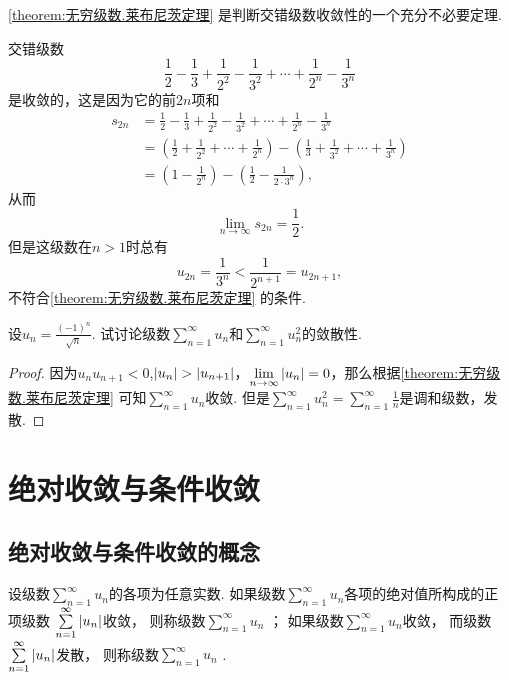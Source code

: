 \cref{theorem:无穷级数.莱布尼茨定理} 是判断交错级数收敛性的一个充分不必要定理.
\begin{example}
交错级数\[
\frac{1}{2} - \frac{1}{3}
+ \frac{1}{2^2} - \frac{1}{3^2}
+ \dotsm + \frac{1}{2^n} - \frac{1}{3^n}
\]是收敛的，这是因为它的前\(2n\)项和\begin{align*}
s_{2n} &= \frac{1}{2} - \frac{1}{3}
+ \frac{1}{2^2} - \frac{1}{3^2}
+ \dotsm + \frac{1}{2^n} - \frac{1}{3^n} \\
&= \left(\frac{1}{2} + \frac{1}{2^2} + \dotsm + \frac{1}{2^n}\right)
 - \left(\frac{1}{3} + \frac{1}{3^2} + \dotsm + \frac{1}{3^n}\right) \\
&= \left(1 - \frac{1}{2^n}\right)
 - \left(\frac{1}{2} - \frac{1}{2\cdot3^n}\right),
\end{align*}从而\[
\lim\limits_{n\to\infty} s_{2n} = \frac{1}{2}.
\]但是这级数在\(n>1\)时总有\[
u_{2n} = \frac{1}{3^n} < \frac{1}{2^{n+1}} = u_{2n+1},
\]不符合\cref{theorem:无穷级数.莱布尼茨定理} 的条件.
\end{example}

\begin{example}
设\(u_n = \frac{(-1)^n}{\sqrt{n}}\).
试讨论级数\(\sum\limits_{n=1}^\infty u_n\)和\(\sum\limits_{n=1}^\infty u_n^2\)的敛散性.
\begin{proof}
因为\(u_n u_{n+1} < 0\),\(\abs{u_n} > \abs{u_{n+1}}\)，\(\lim\limits_{n\to\infty} \abs{u_n} = 0\)，那么根据\cref{theorem:无穷级数.莱布尼茨定理} 可知\(\sum\limits_{n=1}^\infty u_n\)收敛.
但是\(\sum\limits_{n=1}^\infty u_n^2 = \sum\limits_{n=1}^\infty \frac{1}{n}\)是调和级数，发散.
\end{proof}
\end{example}

\section{绝对收敛与条件收敛}
\subsection{绝对收敛与条件收敛的概念}
\begin{definition}
设级数\(\sum\limits_{n=1}^\infty u_n\)的各项为任意实数.
如果级数\(\sum\limits_{n=1}^\infty u_n\)各项的绝对值所构成的正项级数
\(\sum\limits_{n=1}^\infty \abs{u_n}\)收敛，
则称级数\(\sum\limits_{n=1}^\infty u_n\) ；
如果级数\(\sum\limits_{n=1}^\infty u_n\)收敛，
而级数\(\sum\limits_{n=1}^\infty \abs{u_n}\)发散，
则称级数\(\sum\limits_{n=1}^\infty u_n\) .
\end{definition}

